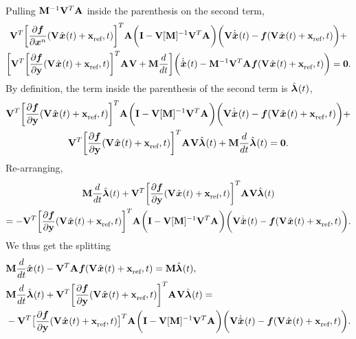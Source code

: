 \documentclass[3p,computermodern,10pt]{elsarticle}
\begin{document}
\begin{appendices}
\begin{multline*}
\end{multline*}
Pulling $\mathbf{M}^{-1} \mathbf {V}^T \mathbf{A}^{}$ inside the parenthesis on the second term,
\begin{multline*}
\mathbf {V}^T \bigg[\frac{\partial \boldsymbol f}{\partial \boldsymbol x^n}(\mathbf {V}^{} \hat{ \boldsymbol x}^{}(t) + \mathbf{x}_\text{ref}^{},t) \bigg]^T \mathbf{A}^{}\bigg( \mathbf{I} - \mathbf {V}[\mathbf{M}]^{-1} \mathbf {V}^T \mathbf{A}^{} \bigg)  \bigg(  \mathbf {V} \dot{\hat{ \boldsymbol x}}^{}(t)   -  \boldsymbol f(\mathbf {V}^{} \hat{ \boldsymbol x}^{}(t) + \mathbf{x}_\text{ref}^{},t) \bigg)  + \\  
\bigg[ \mathbf {V}^T \bigg[\frac{\partial \boldsymbol f}{\partial \mathbf{y}}(\mathbf {V}^{} \hat{ \boldsymbol x}^{}(t) + \mathbf{x}_\text{ref}^{},t) \bigg]^T \mathbf{A}^{} \mathbf {V}  +   \mathbf{M} \frac{d}{dt} \bigg] \bigg( \dot{\hat{ \boldsymbol x}}^{}(t)  - \mathbf{M}^{-1} \mathbf {V}^T \mathbf{A}^{}  \boldsymbol f(\mathbf {V}^{} \hat{ \boldsymbol x}^{}(t) + \mathbf{x}_\text{ref}^{},t) \bigg) = \boldsymbol 0.
\end{multline*}
By definition, the term inside the parenthesis of the second term is $\hat{\boldsymbol \lambda}^{}(t)$,
\begin{multline*}
\mathbf {V}^T \bigg[\frac{\partial \boldsymbol f}{\partial \mathbf{y}}(\mathbf {V}^{} \hat{ \boldsymbol x}^{}(t) + \mathbf{x}_\text{ref}^{},t) \bigg]^T \mathbf{A}^{}\bigg( \mathbf{I} - \mathbf {V} [\mathbf{M}]^{-1} \mathbf {V}^T \mathbf{A}^{} \bigg)  \bigg(  \mathbf {V} \dot{\hat{ \boldsymbol x}}^{}(t)    -  \boldsymbol f(\mathbf {V}^{} \hat{ \boldsymbol x}^{}(t) + \mathbf{x}_\text{ref}^{},t) \bigg)  +   \\ \mathbf {V}^T \bigg[\frac{\partial \boldsymbol f}{\partial \mathbf{y}}(\mathbf {V}^{} \hat{ \boldsymbol x}^{}(t) + \mathbf{x}_\text{ref}^{},t) \bigg]^T \mathbf{A}^{} \mathbf {V} \hat{\boldsymbol \lambda}^{}(t)  +  \mathbf{M} \frac{d}{dt} \hat{\boldsymbol \lambda}^{}(t)= \boldsymbol 0.
\end{multline*}
Re-arranging,
\begin{multline*}
\mathbf{M} \frac{d }{dt}\hat{\boldsymbol \lambda}^{}(t) + \mathbf {V}^T \bigg[\frac{\partial \boldsymbol f}{\partial \mathbf{y}} ( \mathbf {V}^{} \hat{ \boldsymbol x}^{}(t) + \mathbf{x}_\text{ref}^{},t ) \bigg]^T \mathbf{A}^{} \mathbf {V}  \hat{\boldsymbol \lambda}^{}(t)  \\
= - \mathbf {V}^T \bigg[\frac{\partial \boldsymbol f}{\partial \mathbf{y}}(\mathbf {V}^{} \hat{ \boldsymbol x}^{}(t) + \mathbf{x}_\text{ref}^{},t)\bigg]^T \mathbf{A}^{}\bigg( \mathbf{I} - \mathbf {V} [\mathbf{M}]^{-1} \mathbf {V}^T \mathbf{A}^{} \bigg)  \bigg(  \mathbf {V} \dot{\hat{ \boldsymbol x}}^{}(t)   -  \boldsymbol f(\mathbf {V}^{} \hat{ \boldsymbol x}^{}(t) + \mathbf{x}_\text{ref}^{},t) \bigg).
\end{multline*}
We thus get the splitting
\begin{align*}\label{eq:lspg_continuous_appendix}
& \mathbf{M} \frac{d}{dt}\hat{ \boldsymbol x}^{}(t)  -  \mathbf {V}^T \mathbf{A}^{} \boldsymbol f(\mathbf {V}^{} \hat{ \boldsymbol x}^{}(t) + \mathbf{x}_\text{ref}^{},t) =  \mathbf{M} \hat{\boldsymbol \lambda}^{}(t),\\
&\mathbf{M} \frac{d}{dt} \hat{\boldsymbol \lambda}^{}(t)  + \mathbf {V}^T \bigg[\frac{\partial \boldsymbol f}{\partial \mathbf{y}} (\mathbf {V}^{} \hat{ \boldsymbol x}^{}(t) + \mathbf{x}_\text{ref}^{},t) \bigg]^T \mathbf{A}^{} \mathbf {V} \hat{\boldsymbol \lambda}^{}(t) = \\
& -\mathbf {V}^T \big[ \frac{\partial \boldsymbol f}{\partial \mathbf{y}}(\mathbf {V}^{} \hat{ \boldsymbol x}^{}(t) + \mathbf{x}_\text{ref}^{},t) \big] ^T \mathbf{A}^{}  \bigg( \mathbf{I} -   \mathbf {V} [\mathbf{M}]^{-1} \mathbf {V}^T   \mathbf{A}^{} \bigg)\bigg( \mathbf {V} \dot{\hat{ \boldsymbol x}}^{}(t)   -   \boldsymbol f(\mathbf {V}^{} \hat{ \boldsymbol x}^{}(t) + \mathbf{x}_\text{ref}^{},t) \bigg) . 
\end{align*}

\end{appendices}
\end{document}
